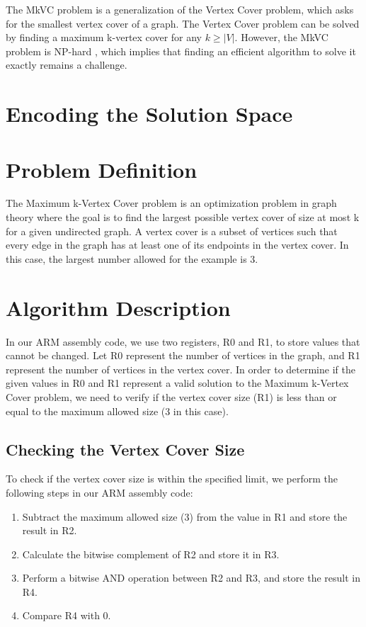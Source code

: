 The MkVC problem is a generalization of the Vertex Cover problem, which asks for the smallest vertex cover of a graph. The Vertex Cover problem can be solved by finding a maximum k-vertex cover for any $k \geq |V|$. However, the MkVC problem is NP-hard \cite{karp1972reducibility}, which implies that finding an efficient algorithm to solve it exactly remains a challenge.

\section{Encoding the Solution Space}
\label{sec:encoding}


\section{Problem Definition}
The Maximum k-Vertex Cover problem is an optimization problem in graph theory where the goal is to find the largest possible vertex cover of size at most k for a given undirected graph. A vertex cover is a subset of vertices such that every edge in the graph has at least one of its endpoints in the vertex cover. In this case, the largest number allowed for the example is 3.

\section{Algorithm Description}
In our ARM assembly code, we use two registers, R0 and R1, to store values that cannot be changed. Let R0 represent the number of vertices in the graph, and R1 represent the number of vertices in the vertex cover. In order to determine if the given values in R0 and R1 represent a valid solution to the Maximum k-Vertex Cover problem, we need to verify if the vertex cover size (R1) is less than or equal to the maximum allowed size (3 in this case).

\subsection{Checking the Vertex Cover Size}
To check if the vertex cover size is within the specified limit, we perform the following steps in our ARM assembly code:

\begin{enumerate}
    \item Subtract the maximum allowed size (3) from the value in R1 and store the result in R2.
    \item Calculate the bitwise complement of R2 and store it in R3.
    \item Perform a bitwise AND operation between R2 and R3, and store the result in R4.
    \item Compare R4 with 0.
\end{enumerate}


